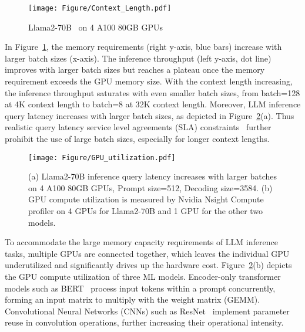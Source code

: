 
\begin{figure}[htbp]
\centering
    \texttt{[image: Figure/Context\_Length.pdf]}
    \caption{Llama2-70B~\cite{touvron2023llama, longlora} on 4 A100 80GB GPUs}
    \label{fig:Context_Length}
\end{figure}

In Figure~\ref{fig:Context_Length}, the memory requirements (right y-axis, blue bars) increase with larger batch sizes (x-axis). The inference throughput (left y-axis, dot line) improves with larger batch sizes but reaches a plateau once the memory requirement exceeds the GPU memory size. With the context length increasing, the inference throughput saturates with even smaller batch sizes, from batch=128 at 4K context length to batch=8 at 32K context length. Moreover, LLM inference query latency increases with larger batch sizes, as depicted in Figure~\ref{fig:GPU_utilization}(a). Thus realistic query latency service level agreements (SLA) constraints~\cite{mlperf-sla} further prohibit the use of large batch sizes, especially for longer context lengths.


\begin{figure}[t]
\centering
    \texttt{[image: Figure/GPU\_utilization.pdf]}
    \caption{(a) Llama2-70B inference query latency increases with larger batches on 4 A100 80GB GPUs,  Prompt size=512, Decoding size=3584. (b) GPU compute utilization is measured by Nvidia Nsight Compute profiler on 4 GPUs for Llama2-70B and 1 GPU for the other two models.}
    \label{fig:GPU_utilization}
\end{figure}


To accommodate the large memory capacity requirements of LLM inference tasks, multiple GPUs are connected together, which leaves the individual GPU underutilized and significantly drives up the hardware cost. Figure~\ref{fig:GPU_utilization}(b) depicts the GPU compute utilization of three ML models. 
Encoder-only transformer models such as BERT~\cite{devlin2018bert} process input tokens within a prompt concurrently, forming an input matrix to multiply with the weight matrix (GEMM).
Convolutional Neural Networks (CNNs) such as ResNet~\cite{he2016deep} implement parameter reuse in convolution operations, further increasing their operational intensity.

